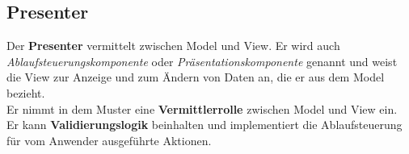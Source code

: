 \subsection*{Presenter}
Der \textbf{Presenter} vermittelt zwischen Model und View.
Er wird auch \textit{Ablaufsteuerungskomponente} oder \textit{Präsentationskomponente} genannt und weist die View zur Anzeige und zum Ändern von Daten an, die er aus dem Model bezieht.\\
Er nimmt in dem Muster eine \textbf{Vermittlerrolle} zwischen Model und View ein.\\
Er kann \textbf{Validierungslogik} beinhalten und implementiert die Ablaufsteuerung für vom Anwender ausgeführte Aktionen.\\



